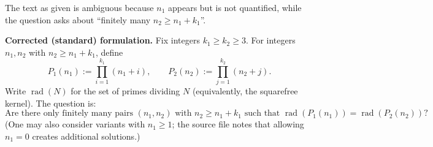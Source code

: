 The text as given is ambiguous because $n_1$ appears but is not quantified, while the question asks about ``finitely many $n_2\ge n_1+k_1$''.

\medskip
\noindent\textbf{Corrected (standard) formulation.}
Fix integers $k_1\ge k_2\ge 3$.
For integers $n_1,n_2$ with $n_2\ge n_1+k_1$, define
\[
P_1(n_1):=\prod_{i=1}^{k_1}(n_1+i),\qquad P_2(n_2):=\prod_{j=1}^{k_2}(n_2+j).
\]
Write $\operatorname{rad}(N)$ for the set of primes dividing $N$ (equivalently, the squarefree kernel).
The question is:
\[
\text{Are there only finitely many pairs }(n_1,n_2)\text{ with }n_2\ge n_1+k_1\text{ such that }\operatorname{rad}(P_1(n_1))=\operatorname{rad}(P_2(n_2))?
\]
(One may also consider variants with $n_1\ge 1$; the source file notes that allowing $n_1=0$ creates additional solutions.)
